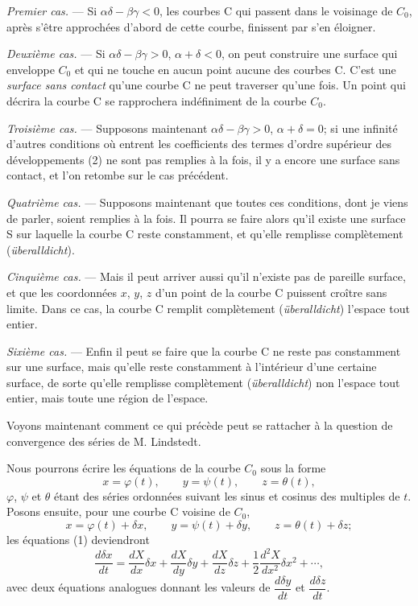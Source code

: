 \documentclass[11pt]{article}
\begin{document}
\emph{Premier cas.} --- Si $\alpha\delta-\beta\gamma<0$, les courbes C qui passent dans le voisinage de $C_0$, après s’être approchées d’abord de cette courbe, finissent par s’en éloigner.

\emph{Deuxième cas.} --- Si $\alpha\delta-\beta\gamma>0$, $\alpha+\delta<0$, on peut construire une surface qui enveloppe $C_0$ et qui ne touche en aucun point aucune des courbes C. C’est une \emph{surface sans contact} qu’une courbe C ne peut traverser qu’une fois. Un point qui décrira la courbe C se rapprochera indéfiniment de la courbe $C_0$.

\emph{Troisième cas.} --- Supposons maintenant $\alpha\delta-\beta\gamma>0$, $\alpha+\delta=0$; si une infinité d’autres conditions où entrent les coefficients des termes d’ordre supérieur des développements (2) ne sont pas remplies à la fois, il y a encore une surface sans contact, et l’on retombe sur le cas précédent.

\emph{Quatrième cas.} --- Supposons maintenant que toutes ces conditions, dont je viens de parler, soient remplies à la fois. Il pourra se faire alors qu’il existe une surface S sur laquelle la courbe C reste constamment, et qu’elle remplisse complètement (\emph{überalldicht}).

\emph{Cinquième cas.} --- Mais il peut arriver aussi qu’il n’existe pas de pareille surface, et que les coordonnées $x$, $y$, $z$ d’un point de la courbe C puissent croître sans limite. Dans ce cas, la courbe C remplit complètement (\emph{überalldicht}) l’espace tout entier.

\emph{Sixième cas.} --- Enfin il peut se faire que la courbe C ne reste pas constamment sur une surface, mais qu’elle reste constamment à l’intérieur d’une certaine surface, de sorte qu’elle remplisse complètement (\emph{überalldicht}) non l’espace tout entier, mais toute une région de l’espace.

Voyons maintenant comment ce qui précède peut se rattacher à la question de convergence des séries de M. Lindstedt.

Nous pourrons écrire les équations de la courbe $C_0$ sous la forme
\begin{equation}\tag{3}
x=\varphi(t),\qquad y=\psi(t),\qquad z=\theta(t),
\end{equation}
$\varphi$, $\psi$ et $\theta$ étant des séries ordonnées suivant les sinus et cosinus des multiples de $t$. Posons ensuite, pour une courbe C voisine de $C_0$,
\[
x=\varphi(t)+\delta x,\qquad
 y=\psi(t)+\delta y,\qquad
 z=\theta(t)+\delta z;
\]
les équations (1) deviendront
\begin{equation}\tag{4}
\frac{d\delta x}{dt}
=\frac{dX}{dx}\delta x+\frac{dX}{dy}\delta y+\frac{dX}{dz}\delta z+
\frac{1}{2}\frac{d^2X}{dx^2}\delta x^2+\cdots,
\end{equation}
avec deux équations analogues donnant les valeurs de $\dfrac{d\delta y}{dt}$ et $\dfrac{d\delta z}{dt}$.
\end{document}
